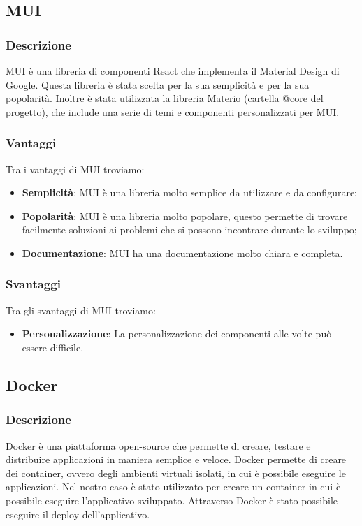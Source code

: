 \subsection*{MUI}

\subsubsection*{Descrizione}
MUI è una libreria di componenti React che implementa il Material Design di Google.
Questa libreria è stata scelta per la sua semplicità e per la sua popolarità.
Inoltre è stata utilizzata la libreria Materio (cartella @core del progetto), che include una serie di temi e componenti personalizzati per MUI.

\subsubsection*{Vantaggi}
Tra i vantaggi di MUI troviamo:
\begin{itemize}
    \item \textbf{Semplicità}: MUI è una libreria molto semplice da utilizzare e da configurare;
    \item \textbf{Popolarità}: MUI è una libreria molto popolare, questo permette di trovare facilmente soluzioni ai problemi che si possono incontrare durante lo sviluppo;
    \item \textbf{Documentazione}: MUI ha una documentazione molto chiara e completa.
\end{itemize}

\subsubsection*{Svantaggi}
Tra gli svantaggi di MUI troviamo:
\begin{itemize}
    \item \textbf{Personalizzazione}: La personalizzazione dei componenti alle volte può essere difficile.
\end{itemize}


\subsection*{Docker}

\subsubsection*{Descrizione}
Docker è una piattaforma open-source che permette di creare, testare e distribuire applicazioni in maniera semplice e veloce.
Docker permette di creare dei container, ovvero degli ambienti virtuali isolati, in cui è possibile eseguire le applicazioni. Nel nostro caso 
è stato utilizzato per creare un container in cui è possibile eseguire l'applicativo sviluppato. Attraverso Docker è stato possibile
eseguire il deploy dell'applicativo.

